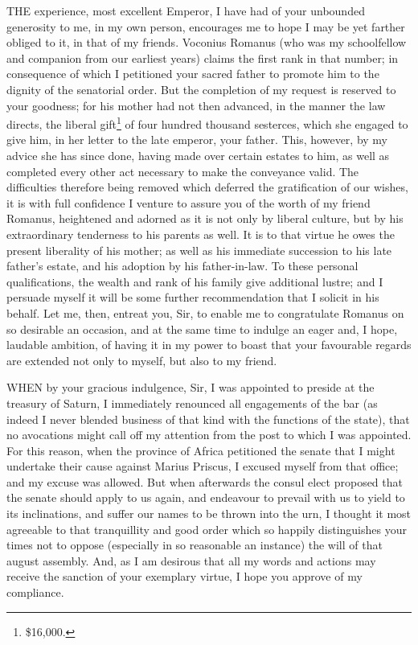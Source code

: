 THE experience, most excellent Emperor, I have had of your unbounded
generosity to me, in my own person, encourages me to hope I may be yet
farther obliged to it, in that of my friends. Voconius Romanus (who was my
schoolfellow and companion from our earliest years) claims the first rank
in that number; in consequence of which I petitioned your sacred father to
promote him to the dignity of the senatorial order. But the completion of
my request is reserved to your goodness; for his mother had not then
advanced, in the manner the law directs, the liberal gift\footnote{\$16,000.}
of four hundred thousand sesterces, which she engaged to give him, in her
letter to the late emperor, your father. This, however, by my advice she
has since done, having made over certain estates to him, as well as
completed every other act necessary to make the conveyance valid. The
difficulties therefore being removed which deferred the gratification of
our wishes, it is with full confidence I venture to assure you of the
worth of my friend Romanus, heightened and adorned as it is not only by
liberal culture, but by his extraordinary tenderness to his parents as
well. It is to that virtue he owes the present liberality of his mother;
as well as his immediate succession to his late father's estate, and his
adoption by his father-in-law. To these personal qualifications, the
wealth and rank of his family give additional lustre; and I persuade
myself it will be some further recommendation that I solicit in his
behalf. Let me, then, entreat you, Sir, to enable me to congratulate
Romanus on so desirable an occasion, and at the same time to indulge an
eager and, I hope, laudable ambition, of having it in my power to boast
that your favourable regards are extended not only to myself, but also to
my friend.


WHEN by your gracious indulgence, Sir, I was appointed to preside at the
treasury of Saturn, I immediately renounced all engagements of the bar (as
indeed I never blended business of that kind with the functions of the
state), that no avocations might call off my attention from the post to
which I was appointed. For this reason, when the province of Africa
petitioned the senate that I might undertake their cause against Marius
Priscus, I excused myself from that office; and my excuse was allowed. But
when afterwards the consul elect proposed that the senate should apply to
us again, and endeavour to prevail with us to yield to its inclinations,
and suffer our names to be thrown into the urn, I thought it most
agreeable to that tranquillity and good order which so happily
distinguishes your times not to oppose (especially in so reasonable an
instance) the will of that august assembly. And, as I am desirous that all
my words and actions may receive the sanction of your exemplary virtue, I
hope you approve of my compliance.

